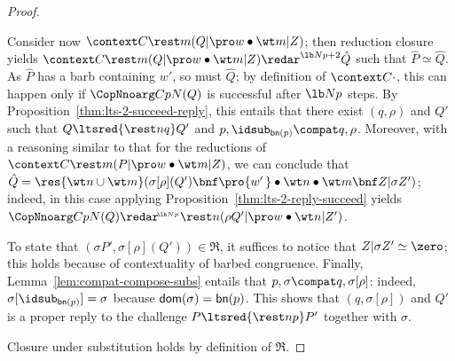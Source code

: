 \documentclass{LMCS}
\renewcommand{\beq}{\simeq}
\newcommand{\withsetnot}[2]{#2}
\begin{document}
\begin{proof}
\begin{itemize}
Consider now $\context C {\rest m(Q|\pro w\bullet\wt m|Z)}$; then
reduction closure yields
$\context C {\rest m(Q|\pro w\bullet\wt m|Z)} \redar^{{\lb N p+2}} \hat Q$ such
that $\hat P \beq \hat Q$. As $\hat P$ has a barb containing $w'$, so must  $\hat Q$;
by definition of $\context C \cdot$, this can happen only if $\CopNnoarg C p N (Q)$
is successful after $\lb N p$ steps. By Proposition~\ref{thm:lts-2-succeed-reply},
this entails that there exist $(q,\rho)$ and $Q'$ such that $Q\ltsred{\rest n q}Q'$
and $p,\idsub_{{\sf bn}(p)}\compat q,\rho$. Moreover, with a reasoning similar to that
for the reductions of $\context C {\rest m(P|\pro w\bullet\wt m|Z)}$, we can conclude
that $\hat Q = \res{\withsetnot{\wt n, \wt m}{\wt n\cup \wt m}}
(\sigma[\rho](Q') \bnf \pro {w'\,} \bullet \wt n \bullet \wt m \bnf Z|\sigma Z')$;
indeed, in this case applying  Proposition~\ref{thm:lts-2-reply-succeed} yields
$\CopNnoarg C p N (Q) \redar^{\!_{\lb N p}} \rest n(\rho Q'|\pro w\bullet \wt n|Z')$.

To state that $(\sigma P', \sigma[\rho](Q')) \in \Re$, it suffices to notice
that $Z|\sigma Z' \beq \zero$; this holds because of contextuality of barbed congruence.
Finally, Lemma~\ref{lem:compat-compose-subs} entails that $p,\sigma\compat q,\sigma[\rho]$: 
indeed, $\sigma[\idsub_{{\sf bn}(p)}] = \sigma$ because ${\sf dom}(\sigma) = {\sf bn}(p)$.
This shows that $(q,\sigma[\rho])$ and $Q'$ is a proper reply to the challenge 
$P \ltsred{\rest n p} P'$ together with $\sigma$.
\end{itemize}
Closure under substitution holds by definition of $\Re$.
\end{proof}
\end{document}
